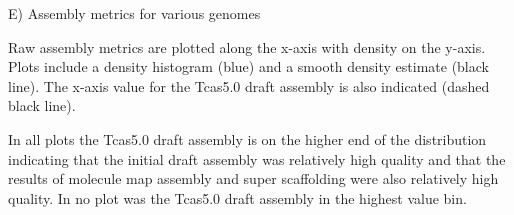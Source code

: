 E) Assembly metrics for various genomes

Raw assembly metrics are plotted along the x-axis with density on the y-axis. Plots include a density histogram (blue) and a smooth density estimate (black line). The x-axis value for the Tcas5.0 draft assembly is also indicated (dashed black line).

In all plots the Tcas5.0 draft assembly is on the higher end of the distribution indicating that the initial draft assembly was relatively high quality and that the results of molecule map assembly and super scaffolding were also relatively high quality. In no plot was the Tcas5.0 draft assembly in the highest value bin. 
